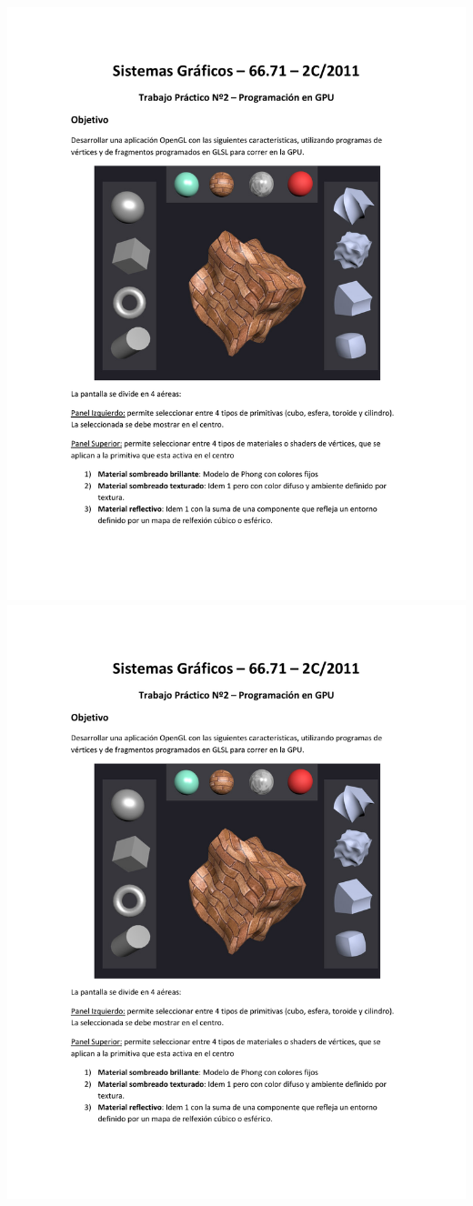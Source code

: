 \documentclass[11pt]{article}
\begin{document}
\begin{center}
\includegraphics[trim = 25mm 20mm 10mm 40mm, clip,height=0.95\textheight,width=1.04\textwidth,page={2}]{tp2-c2-2011.pdf}
\includegraphics[trim = 25mm 20mm 10mm 40mm, clip,height=0.95\textheight,width=1.04\textwidth,page={3}]{tp2-c2-2011.pdf}

\end{center}
\end{document}
